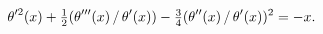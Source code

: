 \[{\mathop{\theta\/}\nolimits'^{2}}\!\left(x\right)+\tfrac{1}{2}(\mathop{\theta%
\/}\nolimits'''\!\left(x\right)/\mathop{\theta\/}\nolimits'\!\left(x\right))-%
\tfrac{3}{4}(\mathop{\theta\/}\nolimits''\!\left(x\right)/\mathop{\theta\/}%
\nolimits'\!\left(x\right))^{2}=-x.\]